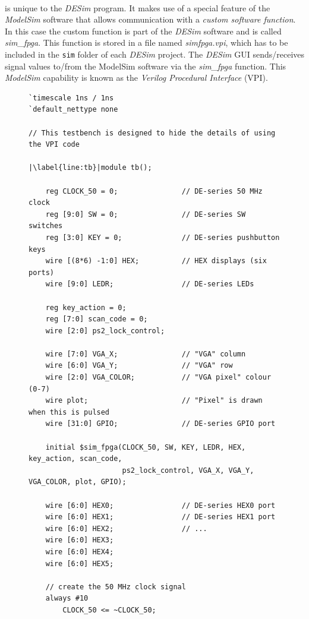 \documentclass[epsfig,10pt,fullpage]{article} \addtolength{\textwidth}{1.5in}
\begin{document}
~\\
\noindent
is unique to the {\it DESim} program. It makes use of a special feature of the {\it ModelSim}
software that allows communication with a {\it custom software function}. In this case
the custom function is part of the {\it DESim} software and is called {\it sim\_fpga}. 
This function is stored in a file named {\it simfpga.vpi}, which has to be included in 
the \texttt{sim} folder of each {\it DESim} project. The {\it DESim} GUI sends/receives signal 
values to/from the ModelSim software via the {\it sim\_fpga} function. 
This {\it ModelSim} capability is known as the {\it Verilog Procedural Interface} (VPI). 

\lstset{language=Verilog,numbers=left,escapechar=|}
\begin{figure}[H]
\begin{center}
\begin{minipage}[t]{15 cm}
\begin{lstlisting}[name=tb]
`timescale 1ns / 1ns
`default_nettype none

// This testbench is designed to hide the details of using the VPI code

|\label{line:tb}|module tb();

    reg CLOCK_50 = 0;               // DE-series 50 MHz clock
    reg [9:0] SW = 0;               // DE-series SW switches
    reg [3:0] KEY = 0;              // DE-series pushbutton keys
    wire [(8*6) -1:0] HEX;          // HEX displays (six ports)
    wire [9:0] LEDR;                // DE-series LEDs

    reg key_action = 0;
    reg [7:0] scan_code = 0;
    wire [2:0] ps2_lock_control;

    wire [7:0] VGA_X;               // "VGA" column
    wire [6:0] VGA_Y;               // "VGA" row
    wire [2:0] VGA_COLOR;           // "VGA pixel" colour (0-7)
    wire plot;                      // "Pixel" is drawn when this is pulsed
    wire [31:0] GPIO;               // DE-series GPIO port

    initial $sim_fpga(CLOCK_50, SW, KEY, LEDR, HEX, key_action, scan_code, 
                      ps2_lock_control, VGA_X, VGA_Y, VGA_COLOR, plot, GPIO);

    wire [6:0] HEX0;                // DE-series HEX0 port
    wire [6:0] HEX1;                // DE-series HEX1 port
    wire [6:0] HEX2;                // ...
    wire [6:0] HEX3;
    wire [6:0] HEX4;
    wire [6:0] HEX5;

    // create the 50 MHz clock signal
    always #10
        CLOCK_50 <= ~CLOCK_50;


\end{lstlisting}
\end{minipage}
\end{center}
\end{figure}
\end{document}
